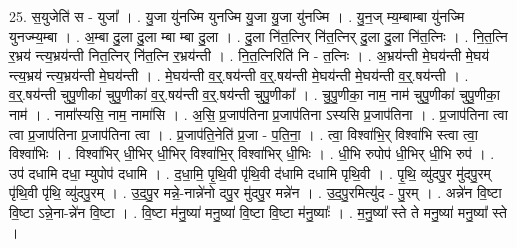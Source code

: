 \documentclass[17pt]{extarticle}
\begin{document}
25. स॒युजेति॑ स - युजा᳚ । . यु॒जा यु॑नज्मि युनज्मि यु॒जा यु॒जा यु॑नज्मि । . यु॒न॒ज् म्य॒म्बाम्बा यु॑नज्मि युनज्म्य॒म्बा । . अ॒म्बा दु॒ला दु॒ला म्बा म्बा दु॒ला । . दु॒ला नि॑त॒त्निर् नि॑त॒त्निर् दु॒ला दु॒ला नि॑त॒त्निः । . नि॒त॒त्नि र॒भ्रय॑ न्त्य॒भ्रय॑न्ती नित॒त्निर् नि॑त॒त्नि र॒भ्रय॑न्ती । . नि॒त॒त्निरिति॑ नि - त॒त्निः । . अ॒भ्रय॑न्ती मे॒घय॑न्ती मे॒घय॑ न्त्य॒भ्रय॑ न्त्य॒भ्रय॑न्ती मे॒घय॑न्ती । . मे॒घय॑न्ती व॒र्॒.षय॑न्ती व॒र्॒.षय॑न्ती मे॒घय॑न्ती मे॒घय॑न्ती व॒र्॒.षय॑न्ती । . व॒र्॒.षय॑न्ती चुपु॒णीका॑ चुपु॒णीका॑ व॒र्॒.षय॑न्ती व॒र्॒.षय॑न्ती चुपु॒णीका᳚ । . चु॒पु॒णीका॒ नाम॒ नाम॑ चुपु॒णीका॑ चुपु॒णीका॒ नाम॑ । . नामा᳚स्यसि॒ नाम॒ नामा॑सि । . अ॒सि॒ प्र॒जाप॑तिना प्र॒जाप॑तिना ऽस्यसि प्र॒जाप॑तिना । . प्र॒जाप॑तिना त्वा त्वा प्र॒जाप॑तिना प्र॒जाप॑तिना त्वा । . प्र॒जाप॑ति॒नेति॑ प्र॒जा - प॒ति॒ना॒ । . त्वा॒ विश्वा॑भि॒र् विश्वा॑भि स्त्वा त्वा॒ विश्वा॑भिः । . विश्वा॑भिर् धी॒भिर् धी॒भिर् विश्वा॑भि॒र् विश्वा॑भिर् धी॒भिः । . धी॒भि रुपोप॑ धी॒भिर् धी॒भि रुप॑ । . उप॑ दधामि दधा॒ म्युपोप॑ दधामि । . द॒धा॒मि॒ पृ॒थि॒वी पृ॑थि॒वी द॑धामि दधामि पृथि॒वी । . पृ॒थि॒ व्यु॑दपु॒र मु॑दपु॒रम् पृ॑थि॒वी पृ॑थि॒ व्यु॑दपु॒रम् । . उ॒द॒पु॒र मन्ने॒-नान्ने॑नो दपु॒र मु॑दपु॒र मन्ने॑न । . उ॒द॒पु॒रमित्यु॑द - पु॒रम् । . अन्ने॑न वि॒ष्टा वि॒ष्टा ऽन्ने॒ना-न्ने॑न वि॒ष्टा । . वि॒ष्टा म॑नु॒ष्या॑ मनु॒ष्या॑ वि॒ष्टा वि॒ष्टा म॑नु॒ष्याः᳚ । . म॒नु॒ष्या᳚ स्ते ते मनु॒ष्या॑ मनु॒ष्या᳚ स्ते । \newline
\end{document}
